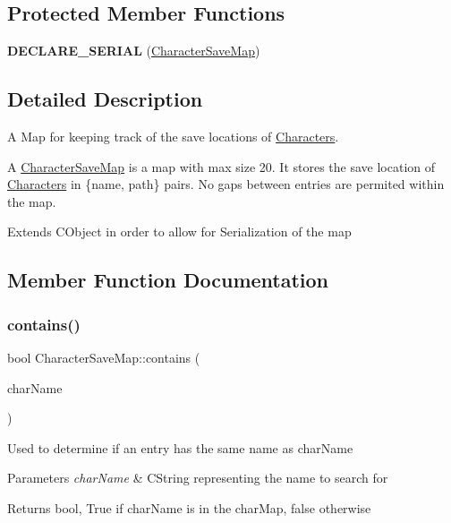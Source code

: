 \subsection*{Protected Member Functions}
\begin{DoxyCompactItemize}
\item 
\hypertarget{class_character_save_map_ae2e1fdded520c188c335b8f1d7c65d71}{}\label{class_character_save_map_ae2e1fdded520c188c335b8f1d7c65d71} 
{\bfseries D\+E\+C\+L\+A\+R\+E\+\_\+\+S\+E\+R\+I\+AL} (\hyperlink{class_character_save_map}{Character\+Save\+Map})
\end{DoxyCompactItemize}


\subsection{Detailed Description}
A Map for keeping track of the save locations of \hyperlink{class_characters}{Characters}. 

A \hyperlink{class_character_save_map}{Character\+Save\+Map} is a map with max size 20. It stores the save location of \hyperlink{class_characters}{Characters} in \{name, path\} pairs. No gaps between entries are permited within the map. 

Extends C\+Object in order to allow for Serialization of the map 

\subsection{Member Function Documentation}
\hypertarget{class_character_save_map_ab139cd8a2bfb27da4a557689f32715b5}{}\label{class_character_save_map_ab139cd8a2bfb27da4a557689f32715b5} 
\subsubsection{\texorpdfstring{contains()}{contains()}}
{\footnotesize\ttfamily bool Character\+Save\+Map\+::contains (\begin{DoxyParamCaption}\item[{const C\+String \&}]{char\+Name }\end{DoxyParamCaption})}

Used to determine if an entry has the same name as char\+Name 
\begin{DoxyParams}{Parameters}
{\em char\+Name} & C\+String representing the name to search for \\
\hline
\end{DoxyParams}
\begin{DoxyReturn}{Returns}
bool, True if char\+Name is in the char\+Map, false otherwise 
\end{DoxyReturn}
\hypertarget{class_character_save_map_ae522be138bfeab45d12a255020150110}{}\label{class_character_save_map_ae522be138bfeab45d12a255020150110} 
